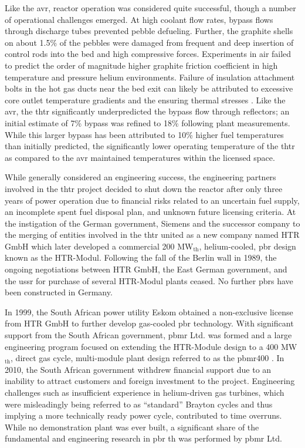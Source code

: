 Like the \gls{avr}, reactor operation was considered quite successful, though a number of operational challenges emerged. At high coolant flow rates, bypass flows through discharge tubes prevented pebble defueling. Further, the graphite shells on about 1.5\% of the pebbles were damaged from frequent and deep insertion of control rods into the bed and high compressive forces. Experiments in air failed to predict the order of magnitude higher graphite friction coefficient in high temperature and pressure helium environments. Failure of insulation attachment bolts in the hot gas ducts near the bed exit can likely be attributed to excessive core outlet temperature gradients and the ensuring thermal stresses \cite{moormann}. Like the \gls{avr}, the \gls{thtr} significantly underpredicted the bypass flow through reflectors; an initial estimate of 7\% bypass was refined to 18\% following plant measurements. While this larger bypass has been attributed to 10\% higher fuel temperatures than initially predicted, the significantly lower operating temperature of the \gls{thtr} as compared to the \gls{avr} maintained temperatures within the licensed space.

While generally considered an engineering success, the engineering partners involved in the \gls{thtr} project decided to shut down the reactor after only three years of power operation due to financial risks related to an uncertain fuel supply, an incomplete spent fuel disposal plan, and unknown future licensing criteria. At the instigation of the German government, Siemens and the successor company to the merging of entities involved in the \gls{thtr} united as a new company named HTR GmbH which later developed a commercial 200 MW$_\text{th}$, helium-cooled, \gls{pbr} design known as the HTR-Modul. Following the fall of the Berlin wall in 1989, the ongoing negotiations between HTR GmbH, the East German government, and the \gls{ussr} for purchase of several HTR-Modul plants ceased. No further \glspl{pbr} have been constructed in Germany.

In 1999, the South African power utility Eskom obtained a non-exclusive license from HTR GmbH to further develop gas-cooled \gls{pbr} technology. With significant support from the South African government, \gls{pbmr} Ltd. was formed and a large engineering program focused on extending the HTR-Module design to a 400 MW$_\text{th}$, direct gas cycle, multi-module plant design referred to as the \gls{pbmr400} \cite{thomas, koster}. In 2010, the South African government withdrew financial support due to an inability to attract customers and foreign investment to the project. Engineering challenges such as insufficient experience in helium-driven gas turbines, which were misleadingly being referred to as ``standard'' Brayton cycles and thus implying a more technically ready power cycle, contributed to time overruns. While no demonstration plant was ever built, a significant share of the fundamental and engineering research in \gls{pbr} \gls{th} was performed by \gls{pbmr} Ltd.


